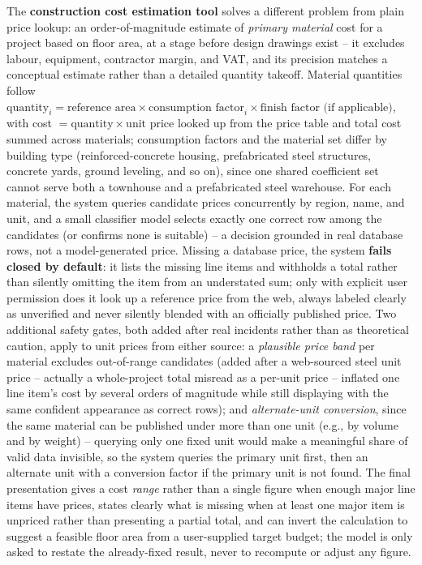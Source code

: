 \documentclass[11pt,a4paper]{article}
\begin{document}
The \textbf{construction cost estimation tool} solves a different problem
from plain price lookup: an order-of-magnitude estimate of \emph{primary
material} cost for a project based on floor area, at a stage before design
drawings exist -- it excludes labour, equipment, contractor margin, and VAT,
and its precision matches a conceptual estimate rather than a detailed
quantity takeoff. Material quantities follow
$\text{quantity}_i = \text{reference area} \times \text{consumption factor}_i
\times \text{finish factor (if applicable)}$, with cost
$= \text{quantity} \times \text{unit price looked up from the price table}$
and total cost summed across materials; consumption factors and the
material set differ by building type (reinforced-concrete housing,
prefabricated steel structures, concrete yards, ground leveling, and so on),
since one shared coefficient set cannot serve both a townhouse and a
prefabricated steel warehouse. For each material, the system queries
candidate prices concurrently by region, name, and unit, and a small
classifier model selects exactly one correct row among the candidates (or
confirms none is suitable) -- a decision grounded in real database rows, not
a model-generated price. Missing a database price, the system
\textbf{fails closed by default}: it lists the missing line items and
withholds a total rather than silently omitting the item from an
understated sum; only with explicit user permission does it look up a
reference price from the web, always labeled clearly as unverified and never
silently blended with an officially published price. Two additional safety
gates, both added after real incidents rather than as theoretical caution,
apply to unit prices from either source: a \emph{plausible price band} per
material excludes out-of-range candidates (added after a web-sourced steel
unit price -- actually a whole-project total misread as a per-unit price --
inflated one line item's cost by several orders of magnitude while still
displaying with the same confident appearance as correct rows); and
\emph{alternate-unit conversion}, since the same material can be published
under more than one unit (e.g., by volume and by weight) -- querying only
one fixed unit would make a meaningful share of valid data invisible, so the
system queries the primary unit first, then an alternate unit with a
conversion factor if the primary unit is not found. The final presentation
gives a cost \emph{range} rather than a single figure when enough major line
items have prices, states clearly what is missing when at least one major
item is unpriced rather than presenting a partial total, and can invert the
calculation to suggest a feasible floor area from a user-supplied target
budget; the model is only asked to restate the already-fixed result, never
to recompute or adjust any figure.
\end{document}
